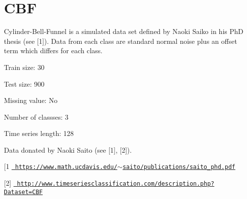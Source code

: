 \chapter{CBF}
\hypertarget{md_external_2data_2UCRArchive__2018_2CBF_2README}{}\label{md_external_2data_2UCRArchive__2018_2CBF_2README}
\label{md_external_2data_2UCRArchive__2018_2CBF_2README_autotoc_md26}%
%
 Cylinder-\/\+Bell-\/\+Funnel is a simulated data set defined by Naoki Saiko in his PhD thesis (see \mbox{[}1\mbox{]}). Data from each class are standard normal noise plus an offset term which differs for each class.

Train size\+: 30

Test size\+: 900

Missing value\+: No

Number of classses\+: 3

Time series length\+: 128

Data donated by Naoki Saito (see \mbox{[}1\mbox{]}, \mbox{[}2\mbox{]}).

\mbox{[}1 \href{https://www.math.ucdavis.edu/~saito/publications/saito_phd.pdf}{\texttt{ https\+://www.\+math.\+ucdavis.\+edu/\texorpdfstring{$\sim$}{\string~}saito/publications/saito\+\_\+phd.\+pdf}}

\mbox{[}2\mbox{]} \href{http://www.timeseriesclassification.com/description.php?Dataset=CBF}{\texttt{ http\+://www.\+timeseriesclassification.\+com/description.\+php?\+Dataset=\+CBF}} 